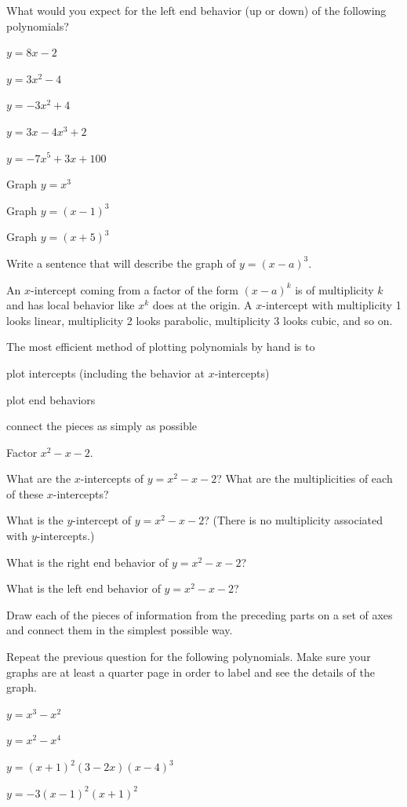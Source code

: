 \bq What would you expect for the left end behavior (up or down) of the following polynomials?
\be
\item $y= 8x-2$
\item $y=3x^2-4$
\item $y=-3x^2+4$
\item $y=3x-4x^3+2$
\item $y=-7x^5+3x+100$
\ee
\eq

\bq
\be
\item Graph $y=x^3$
\item Graph $y=(x-1)^3$
\item Graph $y=(x+5)^3$
\item Write a sentence that will describe the graph of $y=(x-a)^3$.
\ee \eq

\begin{info}
An $x$-intercept coming from a factor of the form $(x-a)^k$ is of multiplicity $k$ and has local behavior like $x^k$ does at the origin. A $x$-intercept with multiplicity 1 looks linear, multiplicity 2 looks parabolic, multiplicity 3 looks cubic, and so on.

The most efficient method of plotting polynomials by hand is to
\be
\item plot intercepts (including the behavior at $x$-intercepts)
\item plot end behaviors
\item connect the pieces as simply as possible
\ee
\end{info}

\bq
\be
\item Factor $x^2-x-2$.
\item What are the $x$-intercepts of $y=x^2-x-2$? What are the multiplicities of each of these $x$-intercepts?
\item What is the $y$-intercept of $y=x^2-x-2$? (There is no multiplicity associated with $y$-intercepts.)
\item What is the right end behavior of $y=x^2-x-2$?
\item What is the left end behavior of $y=x^2-x-2$?
\item Draw each of the pieces of information from the preceding parts on a set of axes and connect them in the simplest possible way.
\ee
\eq


\bq Repeat the previous question for the following polynomials. Make sure your graphs are at least a quarter page in order to label and see the details of the graph.
\be
\item $y=x^3-x^2$
\item $y=x^2-x^4$
\item $y=(x+1)^2(3-2x)(x-4)^3$
\item $y=-3(x-1)^2(x+1)^2$
\ee
\eq

